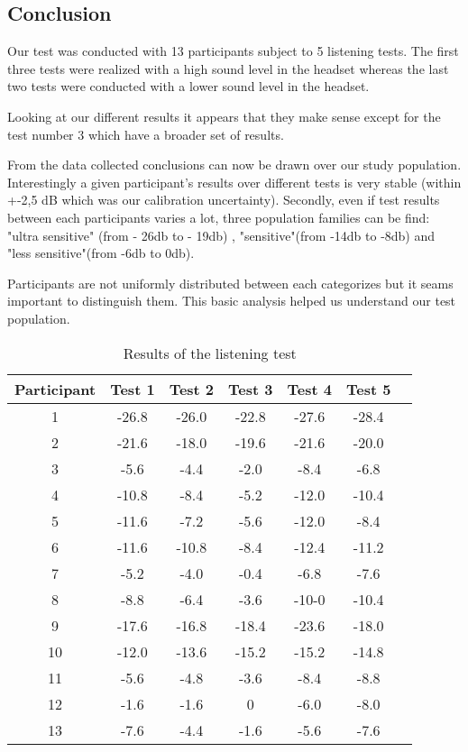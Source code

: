 \subsection{Conclusion}

Our test was conducted with 13 participants subject to 5 listening tests. The first three tests were realized with a high sound level in the headset whereas the last two tests were conducted with a lower sound level in the headset. 

Looking at our different results it appears that they make sense except for the test number 3 which have a broader set of results. 

From the data collected conclusions can now be drawn over our study population. 
Interestingly a given participant's results over different tests is very stable (within +-2,5 dB which was our calibration uncertainty).  Secondly, even if test results between each participants varies a lot, three population families can be find: "ultra sensitive" (from - 26db to - 19db) , "sensitive"(from -14db to -8db) and "less sensitive"(from -6db to 0db). 

Participants are not uniformly distributed between each categorizes but it seams important to distinguish them. This basic analysis helped us understand our test population.

\begin{table}[H]
\centering
\begin{tabular}{*{7}{c}}
  \hline
  Participant & Test 1 & Test 2 & Test 3  & Test 4  & Test 5  
  \\
  \hline
  1 & -26.8 & -26.0 &	-22.8 & -27.6 & -28.4 \\
  2 & -21.6 & -18.0 & -19.6  & -21.6  & -20.0 \\
  3 & -5.6 & -4.4 & -2.0 & -8.4 & -6.8  \\
  4 & -10.8 & -8.4 & -5.2 & -12.0 & -10.4 \\
  5 & -11.6 & -7.2 & -5.6	 & -12.0 & -8.4 \\
  6 & -11.6 & -10.8 & -8.4 & -12.4 & -11.2 \\
  7 & -5.2 & -4.0 & -0.4 & -6.8 & -7.6 \\
  8 & -8.8 & -6.4 & -3.6 & -10-0 & -10.4 \\
  9 & -17.6 & -16.8 & -18.4 & -23.6 & -18.0 \\
  10 & -12.0 & -13.6 & -15.2 & -15.2 & 	-14.8 \\
  11 & -5.6 & -4.8 & -3.6 & -8.4 & -8.8 \\
  12 & -1.6 & -1.6 & 0	 & -6.0 & 	-8.0 \\
  13 & -7.6 & -4.4 & -1.6	 & -5.6 & 	-7.6   \\
  \hline
\end{tabular}
  \caption{Results of the listening test}
	\label{tab:ListeningResults}
\end{table}

